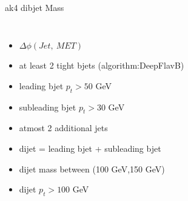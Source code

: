 \documentclass[10pt,xcolor=dvipsnames]{beamer}
\begin{document}
\begin{frame}[fragile]{ak4 dibjet Mass}
\begin{columns}
\begin{itemize}
          \item {$\Delta \phi (Jet, \ MET)$}
          \item {at least 2 tight bjets (algorithm:DeepFlavB)}
          \item {leading bjet $p_t > 50 $ GeV}
          \item {subleading bjet $p_t > 30 $ GeV}
          \item {atmost 2 additional jets}
          \item {dijet = leading bjet + subleading bjet}
          \item {dijet mass between (100 GeV,150 GeV)}
          \item {dijet $p_t > 100 $ GeV}
        \end{itemize}
      \end{columns}
    \end{frame}

\end{document}
